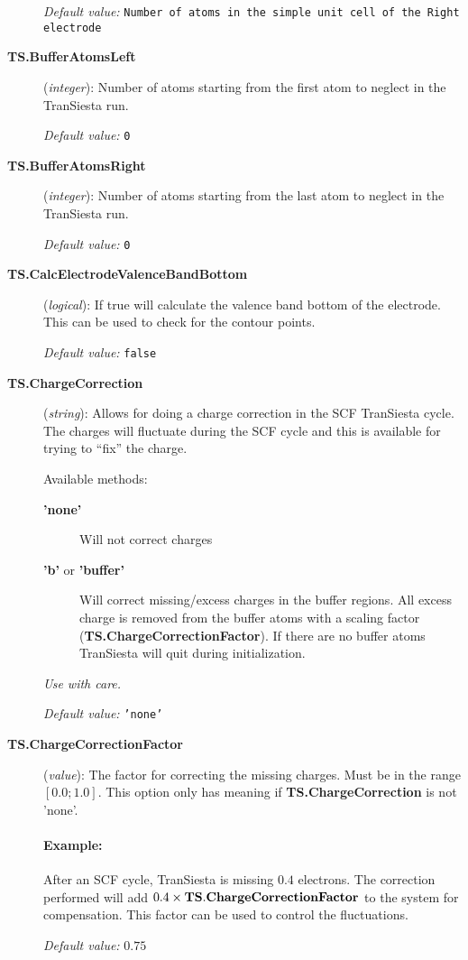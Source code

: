 \documentclass[11pt]{article}
\begin{document}
\begin{description}
{\it Default value:} {\tt Number of atoms in the simple unit cell of
  the Right electrode}

\item[{\bf TS.BufferAtomsLeft}] ({\it integer}): 
Number of atoms starting from the first atom to neglect in the  
{\sc TranSiesta} run. %

{\it Default value:} {\tt 0} 

\item[{\bf TS.BufferAtomsRight}] ({\it integer}): 
Number of atoms starting from the last atom to neglect in the  
{\sc TranSiesta} run.%

{\it Default value:} {\tt 0} 

\item [{\bf TS.CalcElectrodeValenceBandBottom}]({\it logical}): 
If true will calculate the valence band bottom of the electrode.
This can be used to check for the contour points.

{\it Default value:} {\tt false}

\item [{\bf TS.ChargeCorrection}] ({\it string}):
Allows for doing a charge correction in the SCF {\sc TranSiesta} cycle.
The charges will fluctuate during the SCF cycle and this is available for
trying to ``fix'' the charge. 

Available methods:
\begin{description}
  \item[{\bf 'none'}] Will not correct charges
  \item[{\bf 'b'} or {\bf 'buffer'}] Will correct missing/excess charges
  in the buffer regions. All excess charge is removed from the buffer
  atoms with a scaling factor ({\bf TS.ChargeCorrectionFactor}). 
  If there are no buffer atoms {\sc TranSiesta} will quit during
  initialization. 
\end{description}


{\it Use with care.}

{\it Default value:} {\tt 'none'}

\item [{\bf TS.ChargeCorrectionFactor}] ({\it value}):
The factor for correcting the missing charges. Must be in the range
$[0.0;1.0]$. This option only has meaning if {\bf TS.ChargeCorrection}
is not 'none'.

\paragraph{Example:} After an SCF cycle, {\sc TranSiesta} is missing
$0.4$ electrons. The correction performed will add $0.4 \times \bf
TS.ChargeCorrectionFactor$ to the system for compensation. 
This factor can be used to control the fluctuations.

{\it Default value:} $0.75$
\end{description}
\end{document}
